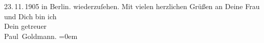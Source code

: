 \begin{ledgroupsized}[t]{13cm}
{{{                     23. 11. 1905 in
                     Berlin.}}}\label{K_L03080-7h} wiederzuſehen.\pend
           \pstart
           Mit vielen herzlichen Grüßen an Deine Frau und Dich bin ich {\\[\baselineskip]}Dein getreuer {\\[\baselineskip]}\spacefill\mbox{Paul Goldmann.}\pend
           \leftskip=0em{}
         
         \endnumbering{}\end{ledgroupsized}  \newcommand{\dateiname}{L03080}\newcommand{\titel}{Paul Goldmann an Arthur Schnitzler, 21. 8. [1905?]}\newcommand{\editorInnen}{Martin Anton Müller und Laura Untner}
      
